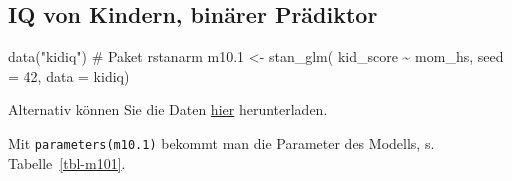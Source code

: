 \documentclass[
  a4paper,
  DIV=11]{scrreprt}
\newenvironment{Shaded}{\begin{snugshade}}{\end{snugshade}}
\newcommand{\AttributeTok}[1]{\textcolor[rgb]{0.40,0.45,0.13}{#1}}
\newcommand{\CommentTok}[1]{\textcolor[rgb]{0.37,0.37,0.37}{#1}}
\newcommand{\DecValTok}[1]{\textcolor[rgb]{0.68,0.00,0.00}{#1}}
\newcommand{\FloatTok}[1]{\textcolor[rgb]{0.68,0.00,0.00}{#1}}
\newcommand{\FunctionTok}[1]{\textcolor[rgb]{0.28,0.35,0.67}{#1}}
\newcommand{\NormalTok}[1]{\textcolor[rgb]{0.00,0.23,0.31}{#1}}
\newcommand{\OtherTok}[1]{\textcolor[rgb]{0.00,0.23,0.31}{#1}}
\newcommand{\SpecialCharTok}[1]{\textcolor[rgb]{0.37,0.37,0.37}{#1}}
\newcommand{\StringTok}[1]{\textcolor[rgb]{0.13,0.47,0.30}{#1}}
\theoremstyle{definition}
\theoremstyle{remark}
\begin{document}
\hypertarget{iq-von-kindern-binuxe4rer-pruxe4diktor}{%
\subsection{IQ von Kindern, binärer
Prädiktor}\label{iq-von-kindern-binuxe4rer-pruxe4diktor}}

\begin{Shaded}
\begin{Highlighting}[]
\FunctionTok{data}\NormalTok{(}\StringTok{"kidiq"}\NormalTok{)  }\CommentTok{\# Paket rstanarm}
\NormalTok{m10}\FloatTok{.1} \OtherTok{\textless{}{-}} \FunctionTok{stan\_glm}\NormalTok{(}
\NormalTok{  kid\_score }\SpecialCharTok{\textasciitilde{}}\NormalTok{ mom\_hs, }
  \AttributeTok{seed =} \DecValTok{42}\NormalTok{,}
  \AttributeTok{data =}\NormalTok{ kidiq)}
\end{Highlighting}
\end{Shaded}

Alternativ können Sie die Daten
\href{https://raw.githubusercontent.com/sebastiansauer/Lehre/main/data/kidiq.csv}{hier}
herunterladen.

Mit \texttt{parameters(m10.1)} bekommt man die Parameter des Modells, s.
Tabelle~\ref{tbl-m101}.
\end{document}
